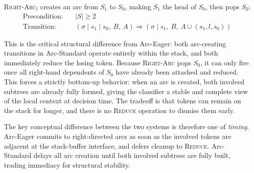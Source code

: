 \documentclass[12pt,letterpaper]{article}
\begin{document}
\textsc{Right-Arc}$_l$ creates an arc from $S_1$ to $S_0$, making $S_1$ the head of $S_0$, then pops $S_0$:
\begin{align}
\text{Precondition:} \quad & |S| \geq 2 \\
\text{Transition:} \quad & (\sigma \mid s_1 \mid s_0,\ B,\ A) \Longrightarrow (\sigma \mid s_1,\ B,\ A \cup {(s_1, l, s_0)})
\end{align}

This is the critical structural difference from Arc-Eager: both arc-creating transitions in Arc-Standard operate entirely within the stack, and both immediately reduce the losing token. Because \textsc{Right-Arc} pops $S_0$, it can only fire once all right-hand dependents of $S_0$ have already been attached and reduced. This forces a strictly bottom-up behavior: when an arc is created, both involved subtrees are already fully formed, giving the classifier a stable and complete view of the local context at decision time. The tradeoff is that tokens can remain on the stack for longer, and there is no \textsc{Reduce} operation to dismiss them early.

The key conceptual difference between the two systems is therefore one of \emph{timing}. Arc-Eager commits to right-directed arcs as soon as the involved tokens are adjacent at the stack-buffer interface, and defers cleanup to \textsc{Reduce}. Arc-Standard delays all arc creation until both involved subtrees are fully built, trading immediacy for structural stability.
\end{document}
